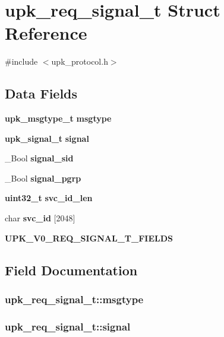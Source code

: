 \section{upk\_\-req\_\-signal\_\-t Struct Reference}
\label{structupk__req__signal__t}


{\ttfamily \#include $<$upk\_\-protocol.h$>$}

\subsection*{Data Fields}
\begin{DoxyCompactItemize}
\item 
{\bf upk\_\-msgtype\_\-t} {\bf msgtype}
\item 
{\bf upk\_\-signal\_\-t} {\bf signal}
\item 
\_\-Bool {\bf signal\_\-sid}
\item 
\_\-Bool {\bf signal\_\-pgrp}
\item 
{\bf uint32\_\-t} {\bf svc\_\-id\_\-len}
\item 
char {\bf svc\_\-id} [2048]
\item 
{\bf UPK\_\-V0\_\-REQ\_\-SIGNAL\_\-T\_\-FIELDS}
\end{DoxyCompactItemize}


\subsection{Field Documentation}
\subsubsection[{msgtype}]{ {\bf upk\_\-req\_\-signal\_\-t::msgtype}}\label{structupk__req__signal__t_acd65bb95e570a5cb9c775ef8b849d1ac}
\subsubsection[{signal}]{ {\bf upk\_\-req\_\-signal\_\-t::signal}}\label{structupk__req__signal__t_ad990da61643353a1139bc112eb87b21e}
